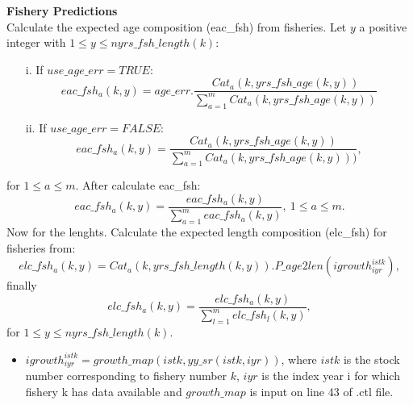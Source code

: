 \documentclass{article}
\begin{document}
\textbf{Fishery Predictions}\\
Calculate the expected age composition (eac\_fsh) from fisheries. Let $y$ a positive integer with $1\leq y \leq nyrs\_fsh\_length(k)$:
\begin{itemize}
\item [i.] If $use\_age\_err=TRUE$:
    \begin{equation}
    eac\_fsh_a(k,y)=age\_err.\dfrac{Cat_a(k,yrs\_fsh\_age(k,y))}{\displaystyle\sum_{a=1}^mCat_a(k,yrs\_fsh\_age(k,y))}
\end{equation}
\item [ii.] If $use\_age\_err=FALSE$:
\begin{equation}
    eac\_fsh_a(k,y)=\dfrac{Cat_a(k,yrs\_fsh\_age(k,y))}{\displaystyle\sum_{a=1}^mCat_a(k,yrs\_fsh\_age(k,y)))},
\end{equation}
\end{itemize}
for $1\leq a \leq m$.
After calculate eac\_fsh:
\begin{equation}
    eac\_fsh_a(k,y)=\dfrac{eac\_fsh_a(k,y)}{\displaystyle\sum_{a=1}^meac\_fsh_a(k,y)}, \ 1\leq a \leq m.
\end{equation}
Now for the lenghts. Calculate the expected length composition (elc\_fsh) for fisheries from: 
\begin{equation}
elc\_fsh_a(k,y)=Cat_a(k,yrs\_fsh\_length(k,y)).P\_age2len(igrowth^{istk}_{iyr}),
\end{equation}
finally
\begin{equation}
elc\_fsh_a(k,y)=\dfrac{elc\_fsh_a(k,y)}{\displaystyle\sum_{l=1}^melc\_fsh_l(k,y)},
\end{equation}
for $1\leq y \leq nyrs\_fsh\_length(k)$.\\
\begin{itemize}
    \item $igrowth^{istk}_{iyr}=growth\_map(istk,yy\_sr(istk,iyr))$, where $istk$ is the stock number corresponding to fishery number $k$, $iyr$ is the index year i for which fishery k has data available and $growth\_map$ is input on line 43 of .ctl file.
\end{itemize}
\end{document}
